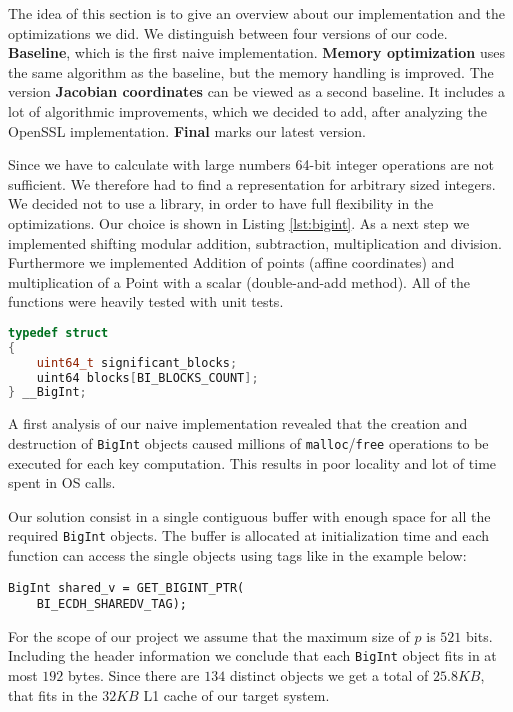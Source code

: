 The idea of this section is to give an overview about our implementation and the optimizations we did. We distinguish between four versions of our code. \textbf{Baseline}, which is the first naive implementation. \textbf{Memory optimization} uses the same algorithm as the baseline, but the memory handling is improved. The version \textbf{Jacobian coordinates} can be viewed as a second baseline. It includes a lot of algorithmic improvements, which we decided to add, after analyzing the OpenSSL implementation. \textbf{Final} marks our latest version.

Since we have to calculate with large numbers 64-bit integer operations are not sufficient. We therefore had to find a representation for arbitrary sized integers. We decided not to use a library, in order to have full flexibility in the optimizations. Our choice is shown in Listing \ref{lst:bigint}. As a next step we implemented shifting modular addition, subtraction, multiplication and division. Furthermore we implemented Addition of points (affine coordinates) and multiplication of a Point with a scalar (double-and-add method). All of the functions were heavily tested with unit tests.

\begin{lstlisting}[frame=single,  captionpos=b, caption=representation of the arbitrary size integers, label=lst:bigint, language=c]
typedef struct 
{
    uint64_t significant_blocks;    
    uint64 blocks[BI_BLOCKS_COUNT]; 
} __BigInt;
\end{lstlisting}


A first analysis of our naive implementation revealed that the creation and destruction of \texttt{BigInt} objects caused millions of \texttt{malloc}/\texttt{free} operations to be executed for each key computation. This results in poor locality and lot of time spent in OS calls.

Our solution consist in a single contiguous buffer with enough space for all the required \texttt{BigInt} objects. The buffer is allocated at initialization time and each function can access the single objects using tags like in the example below:

\begin{lstlisting}[frame=single, mathescape=true, captionpos=b, caption=Access by tag example]
BigInt shared_v = GET_BIGINT_PTR(
    BI_ECDH_SHAREDV_TAG);
\end{lstlisting}

For the scope of our project we assume that the maximum size of $p$ is $521$ bits. Including the header information we conclude that each \texttt{BigInt} object fits in at most $192$ bytes. Since there are $134$ distinct objects we get a total of $25.8KB$, that fits in the $32KB$ L1 cache of our target system.


